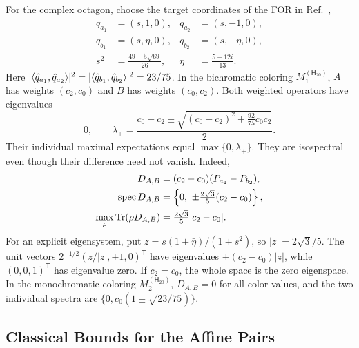 \documentclass[aps,pra,reprint,superscriptaddress,longbibliography,nofootinbib,floatfix,10pt]{revtex4-2}
\theoremstyle{definition}\newtheorem{definition}[theorem]{Definition}
\theoremstyle{remark}\newtheorem{remark}[theorem]{Remark}
\newcommand{\Htwenty}{\mathsf H_{20}}
\begin{document}
For the complex octagon, choose the target coordinates of the FOR in Ref.~\cite{2026-Navara-Svozil-complex-only-3d-hypergraphs},
\begin{equation}\label{eq:weighted-octagon-rays}
\begin{aligned}
q_{a_1}&=(s,1,0),&q_{a_2}&=(s,-1,0),\\
q_{b_1}&=(s,\eta,0),&q_{b_2}&=(s,-\eta,0),\\
s^2&=\frac{49-5\sqrt{69}}{26},&\eta&=\frac{5+12i}{13}.
\end{aligned}
\end{equation}
Here $|\langle \hat q_{a_1},\hat q_{a_2}\rangle|^2=|\langle \hat q_{b_1},\hat q_{b_2}\rangle|^2=23/75$. In the bichromatic coloring $M_1^{(\Htwenty)}$, $A$ has weights $(c_2,c_0)$ and $B$ has weights $(c_0,c_2)$. Both weighted operators have eigenvalues
\begin{equation}\label{eq:weighted-octagon-spectrum}
0,\qquad \lambda_\pm=\frac{c_0+c_2\pm
\sqrt{(c_0-c_2)^2+\tfrac{92}{75}c_0c_2}}{2}.
\end{equation}
Their individual maximal expectations equal $\max\{0,\lambda_+\}$. They are isospectral even though their difference need not vanish. Indeed,
\begin{equation}\label{eq:weighted-octagon-difference}
\begin{aligned}
D_{A,B}&=(c_2-c_0)(P_{a_1}-P_{b_2}),\\
\operatorname{spec}D_{A,B}&=\left\{0,\ \pm\tfrac{2\sqrt3}{5}(c_2-c_0)\right\},\\
\max_\rho\Tr(\rho D_{A,B})&=\tfrac{2\sqrt3}{5}|c_2-c_0|.
\end{aligned}
\end{equation}
For an explicit eigensystem, put $z=s(1+\bar\eta)/(1+s^2)$, so $|z|=2\sqrt3/5$. The unit vectors $2^{-1/2}(z/|z|,\pm1,0)^{\mathsf T}$ have eigenvalues $\pm(c_2-c_0)|z|$, while $(0,0,1)^{\mathsf T}$ has eigenvalue zero. If $c_2=c_0$, the whole space is the zero eigenspace. In the monochromatic coloring $M_2^{(\Htwenty)}$, $D_{A,B}=0$ for all color values, and the two individual spectra are $\{0,c_0(1\pm\sqrt{23/75})\}$.

\subsection{Classical Bounds for the Affine Pairs}\label{sec:classical-affine}
\end{document}
